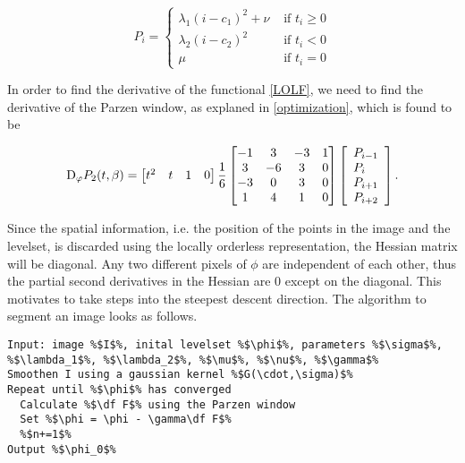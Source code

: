 \begin{equation}
  P_i = 
  \begin{cases}
    \lambda_1(i-c_1)^2 + \nu & \mbox{ if } t_i \geq 0\\
    \lambda_2(i-c_2)^2 & \mbox{ if } t_i < 0\\
    \mu & \mbox{ if } t_i = 0
  \end{cases}
\end{equation}

In order to find the derivative of the functional \eqref{LOLF}, we need to find the derivative of the Parzen window, as explaned in \ref{optimization}, which is found to be

\begin{equation}
{\rm D}_\varphi  P_2(t,\beta) = 
  \begin{bmatrix} t^2 & t & 1 & 0 \end{bmatrix} 
  \frac{1}{6} 
  \begin{bmatrix}
    -1 &  3 & -3 & 1 \\
    3 & -6 &  3 & 0 \\
    -3 &  0 &  3 & 0 \\
    1 &  4 &  1 & 0 
  \end{bmatrix}
  \left[\begin{array}{l} 
      P_{i-1} \\
      P_{i} \\
      P_{i+1} \\
      P_{i+2}
    \end{array}\right].
\end{equation}

Since the spatial information, i.e. the position of the points in the image and the levelset, is discarded using the locally orderless representation, the Hessian matrix will be diagonal. Any two different pixels of $\phi$ are independent of each other, thus the partial second derivatives in the Hessian are 0 except on the diagonal. This motivates to take steps into the steepest descent direction. The algorithm to segment an image looks as follows.
\begin{lstlisting}
Input: image %$I$%, inital levelset %$\phi$%, parameters %$\sigma$%, %$\lambda_1$%, %$\lambda_2$%, %$\mu$%, %$\nu$%, %$\gamma$%
Smoothen I using a gaussian kernel %$G(\cdot,\sigma)$%
Repeat until %$\phi$% has converged
  Calculate %$\df F$% using the Parzen window
  Set %$\phi = \phi - \gamma\df F$%
  %$n+=1$%
Output %$\phi_0$%
\end{lstlisting} 